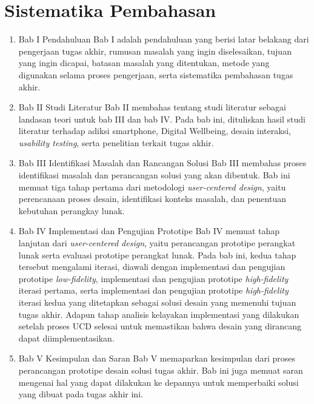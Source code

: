 \section{Sistematika Pembahasan}

\begin{enumerate}
  \item Bab I Pendahuluan
  \subitem Bab I adalah pendahuluan yang berisi latar belakang dari pengerjaan tugas akhir, rumusan masalah yang ingin diselesaikan, tujuan yang ingin dicapai, batasan masalah yang ditentukan, metode yang digunakan selama proses pengerjaan, serta sistematika pembahasan tugas akhir.
   
  \item Bab II Studi Literatur
  \subitem Bab II membahas tentang studi literatur sebagai landasan teori untuk bab III dan bab IV. Pada bab ini, dituliskan hasil studi literatur terhadap adiksi smartphone, Digital Wellbeing, desain interaksi, \textit{usability testing}, serta penelitian terkait tugas akhir.
 
  \item Bab III Identifikasi Masalah dan Rancangan Solusi
  \subitem Bab III membahas proses identifikasi masalah dan perancangan solusi yang akan dibentuk. Bab ini memuat tiga tahap pertama dari metodologi \textit{user-centered design}, yaitu perencanaan proses desain, identifikasi konteks masalah, dan penentuan kebutuhan perangkay lunak.
 
  \item Bab IV Implementasi dan Pengujian Prototipe
  \subitem Bab IV memuat tahap lanjutan dari \textit{user-centered design}, yaitu perancangan prototipe perangkat lunak serta evaluasi prototipe perangkat lunak. Pada bab ini, kedua tahap tersebut mengalami iterasi, diawali dengan implementasi dan pengujian prototipe \textit{low-fidelity}, implementasi dan pengujian prototipe \textit{high-fidelity} iterasi pertama, serta implementasi dan pengujian prototipe \textit{high-fidelity} iterasi kedua yang ditetapkan sebagai solusi desain yang memenuhi tujuan tugas akhir. Adapun tahap analisis kelayakan implementasi yang dilakukan setelah proses UCD selesai untuk memastikan bahwa desain yang dirancang dapat diimplementasikan.
 
  \item Bab V Kesimpulan dan Saran
  \subitem Bab V memaparkan kesimpulan dari proses perancangan prototipe desain solusi tugas akhir. Bab ini juga memuat saran mengenai hal yang dapat dilakukan ke depannya untuk memperbaiki solusi yang dibuat pada tugas akhir ini.
\end{enumerate}